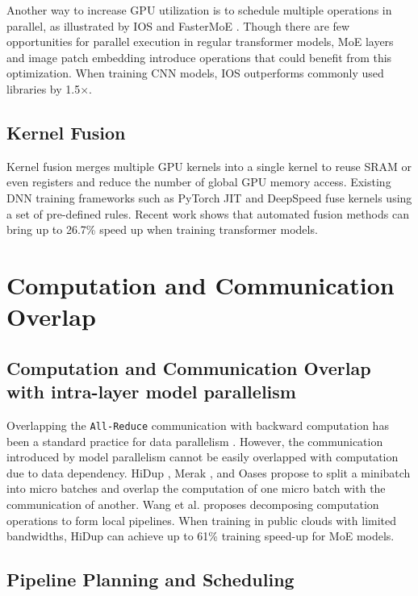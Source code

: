\documentclass[a4paper, 11pt]{article}
\begin{document}
    Another way to increase GPU utilization is to schedule multiple operations in parallel, as illustrated by IOS
    \cite{ios} and FasterMoE \cite{fastermoe}. Though there are few opportunities for parallel execution in regular
    transformer models, MoE layers and image patch embedding introduce operations that could benefit from this
    optimization. When training CNN models, IOS \cite{ios} outperforms commonly used libraries by 1.5$\times$.

    \subsection{Kernel Fusion}

    Kernel fusion merges multiple GPU kernels into a single kernel to reuse SRAM or even registers and reduce the number
    of global GPU memory access. Existing DNN training frameworks such as PyTorch JIT and DeepSpeed fuse kernels using a
    set of pre-defined rules. Recent work \cite{disco} shows that automated fusion methods can bring up to 26.7\% speed
    up when training transformer models.

    \section{Computation and Communication Overlap}

    \subsection{Computation and Communication Overlap with intra-layer model parallelism}

    Overlapping the \texttt{All-Reduce} communication with backward computation has been a standard practice for data
    parallelism \cite{byteps,horovod,deepspeed}. However, the communication introduced by model parallelism cannot be
    easily overlapped with computation due to data dependency. HiDup \cite{hidup}, Merak \cite{merak}, and Oases
    \cite{oases} propose to split a minibatch into micro batches and overlap the computation of one micro batch with
    the communication of another. Wang et al. \cite{overlapdecomposition} proposes decomposing computation operations
    to form local pipelines. When training in public clouds with limited bandwidths, HiDup \cite{hidup} can achieve up to
    61\% training speed-up for MoE models.

    \subsection{Pipeline Planning and Scheduling}
\end{document}
